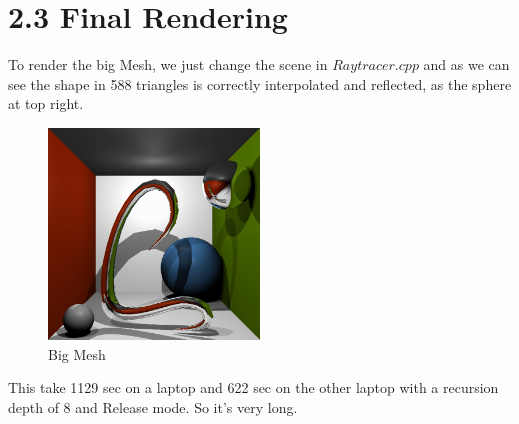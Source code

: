 \documentclass[10pt,a4paper]{report}
\begin{document}
\newpage

\section*{2.3   Final Rendering}
To render the big Mesh, we just change the scene in $Raytracer.cpp$ and as we can see the shape in 588 triangles is correctly interpolated and reflected, as the sphere at top right.
\begin{figure}[h!]
\caption{Big Mesh}
  \centering
    \includegraphics[width=0.5\textwidth]{Cornell.png}
\end{figure}

This take 1129 sec on a laptop and 622 sec on the other laptop with a recursion depth of 8 and Release mode. So it's very long.
\end{document}
